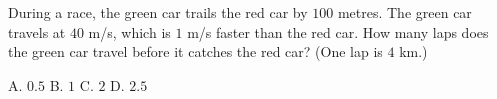 During a race, the green car trails the red car by $100$ metres. The green car travels at $40$ m/s, which is $1$ m/s faster than the red car. How many laps does the green car travel before it catches the red car? (One lap is $4$ km.)

A. $0.5$ \quad B. $1$ \quad C. $2$ \quad D. $2.5$
